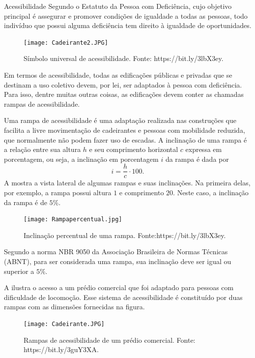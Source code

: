 \begin{task}{Acessibilidade}
Segundo o Estatuto da Pessoa com Deficiência, cujo objetivo principal é assegurar e promover condições de igualdade a todas as pessoas, todo indivíduo que possui alguma deficiência tem direito à igualdade de oportunidades. 

\begin{figure}[H]
    \centering
    \texttt{[image: Cadeirante2.JPG]}
    \caption{Símbolo universal de acessibilidade. Fonte: https://bit.ly/3lbX3ey.}
    \label{Cadeirante2}
\end{figure}


Em termos de acessibilidade, todas as edificações públicas e privadas que se destinam a uso coletivo devem, por lei, ser adaptados à pessoa com deficiência. Para isso, dentre muitas outras coisas, as edificações devem conter as chamadas rampas de acessibilidade. 

Uma rampa de acessibilidade é uma adaptação realizada nas construções que facilita a livre movimentação de cadeirantes e pessoas com mobilidade reduzida, que normalmente não podem fazer uso de escadas. A inclinação de uma rampa é a relação entre sua altura $h$ e seu comprimento horizontal $c$ expressa em porcentagem, ou seja, a inclinação em porcentagem $i$ da rampa é dada por 
$$i=\frac{h}{c}\cdot 100.$$
A  mostra a vista lateral de algumas rampas e suas inclinações. Na primeira delas, por exemplo, a rampa possui altura $1$ e comprimento $20$. Neste caso, a inclinação da rampa é de $5\%$.

\begin{figure}[H]
    \centering
    \texttt{[image: Rampapercentual.jpg]}
    \caption{Inclinação percentual de uma rampa. Fonte:https://bit.ly/3lbX3ey.}
    \label{Rampapercentual}
\end{figure}



Segundo a norma NBR 9050 da Associação Brasileira de Normas Técnicas (ABNT), para ser considerada uma rampa, sua inclinação deve ser igual ou superior a $5\%$. 

A  ilustra  o acesso a um prédio comercial que foi adaptado para pessoas com dificuldade de locomoção. Esse sistema de acessibilidade é constituído por duas rampas com as dimensões fornecidas na figura.

\begin{figure}[H]
    \centering
    \texttt{[image: Cadeirante.JPG]}
    \caption{Rampas de acessibilidade de um prédio comercial. Fonte: https://bit.ly/3guY3XA.}
    \label{Cadeirante}
\end{figure}



\end{task}
